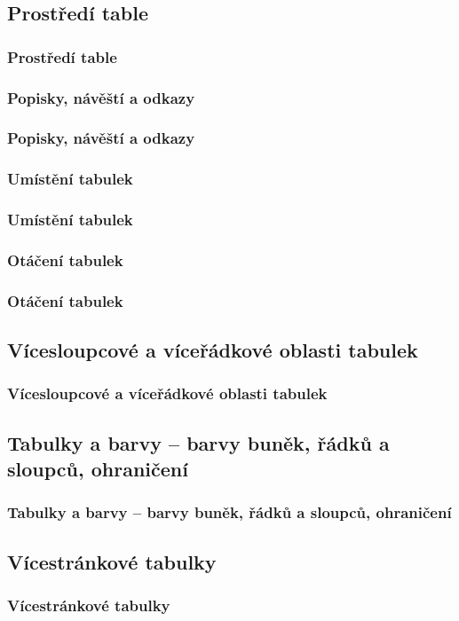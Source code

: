 \subsection{Prostředí table}
\begin{frame}
	\frametitle{Prostředí table}
	\UnderConstruction
\end{frame}


\subsubsection{Popisky, návěští a odkazy}
\begin{frame}
	\frametitle{Popisky, návěští a odkazy}
	\UnderConstruction
\end{frame}


\subsubsection{Umístění tabulek}
\begin{frame}
	\frametitle{Umístění tabulek}
	\UnderConstruction
\end{frame}


\subsubsection{Otáčení tabulek}
\begin{frame}
	\frametitle{Otáčení tabulek}
	\UnderConstruction
\end{frame}


\subsection{Vícesloupcové a víceřádkové oblasti tabulek}
\begin{frame}
	\frametitle{Vícesloupcové a víceřádkové oblasti tabulek}
	\UnderConstruction
\end{frame}


\subsection{Tabulky a barvy -- barvy buněk, řádků a sloupců, ohraničení}
\begin{frame}
	\frametitle{Tabulky a barvy -- barvy buněk, řádků a sloupců, ohraničení}
	\UnderConstruction
\end{frame}


\subsection{Vícestránkové tabulky}
\begin{frame}
	\frametitle{Vícestránkové tabulky}
	\UnderConstruction
\end{frame}

\endinput
